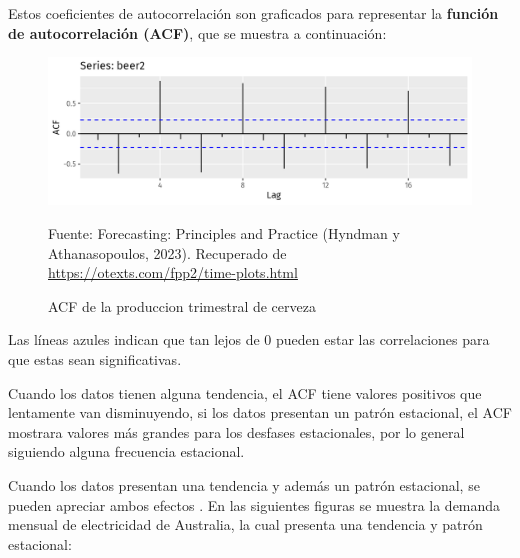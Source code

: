 \begin{itemize}
    Estos coeficientes de autocorrelación son graficados para representar la \textbf{función de autocorrelación (ACF)}, que se muestra a continuación:

    \begin{figure}[H]
        \begin{minipage}[t]{0.9\textwidth}
            \caption{ACF de la produccion trimestral de cerveza}
            \label{autocorrelaciones2}        
        \end{minipage}
    
        \vspace{10pt}
    
        \begin{minipage}[b]{0.9\textwidth}
            \centering
            \includegraphics[width=\textwidth]{img/produccion-cerveza-aust-ACF.png}        
        \end{minipage}
    
        \begin{minipage}[t]{0.9\textwidth}
            Fuente: Forecasting: Principles and Practice (Hyndman y Athanasopoulos, 2023). Recuperado de \url{https://otexts.com/fpp2/time-plots.html}
        \end{minipage}
    \end{figure}

    Las líneas azules indican que tan lejos de 0 pueden estar las correlaciones para que estas sean significativas. 
    
    Cuando los datos tienen alguna tendencia, el ACF tiene valores positivos que lentamente van disminuyendo, si los datos presentan un patrón estacional, el ACF mostrara valores más grandes para los desfases estacionales, por lo general siguiendo alguna frecuencia estacional.
    
    Cuando los datos presentan una tendencia y además un patrón estacional, se pueden apreciar ambos efectos \cite{forecast-time-series-arima}. En las siguientes figuras se muestra la demanda mensual de electricidad de Australia, la cual presenta una tendencia y patrón estacional:


\end{itemize}
